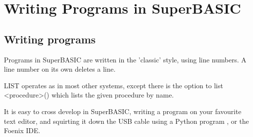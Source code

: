 \chapter{Writing Programs in SuperBASIC}

\section {Writing programs}
Programs in SuperBASIC are written in the 'classic' style, using line numbers. A line number on its own deletes a line.

LIST operates as in most other systems, except there is the option to list <procedure>() which lists the given procedure by name.

It is easy to cross develop in SuperBASIC, writing a program on your favourite text editor, and squirting it down the USB cable using a Python program , or the Foenix IDE.
